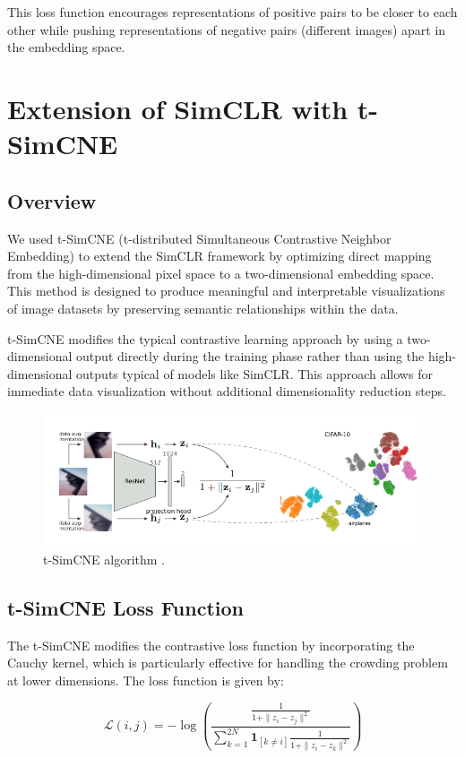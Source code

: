 This loss function encourages representations of positive pairs to be closer to each other while pushing representations of negative pairs (different images) apart in the embedding space.

\section{Extension of SimCLR with t-SimCNE}
\subsection{Overview}
We used t-SimCNE (t-distributed Simultaneous Contrastive Neighbor Embedding) to extend the SimCLR framework by optimizing direct mapping from the high-dimensional pixel space to a two-dimensional embedding space. This method is designed to produce meaningful and interpretable visualizations of image datasets by preserving semantic relationships within the data.

t-SimCNE modifies the typical contrastive learning approach by using a two-dimensional output directly during the training phase rather than using the high-dimensional outputs typical of models like SimCLR. This approach allows for immediate data visualization without additional dimensionality reduction steps.

\begin{figure}[hbt]
\centering
\includegraphics[width=\textwidth]{figs/tsimcne_architecture.png}
\caption{
t-SimCNE algorithm \cite{tsimcne}.
}
\label{fig:secex}
\end{figure}

\subsection{t-SimCNE Loss Function}
The t-SimCNE modifies the contrastive loss function by incorporating the Cauchy kernel, which is particularly effective for handling the crowding problem at lower dimensions. The loss function is given by:

\begin{equation}
\mathcal{L}(i, j) = -\log \left(\frac{\frac{1}{1 + \|z_i - z_j\|^2}}{\sum_{k=1}^{2N} \mathbf{1}_{[k \neq i]} \frac{1}{1 + \|z_i - z_k\|^2}}\right)
\end{equation}

